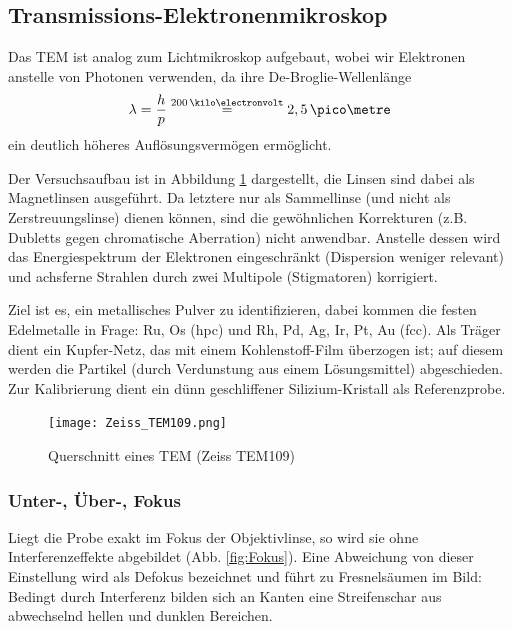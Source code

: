 \newpage
\subsection{Transmissions-Elektronenmikroskop}
Das TEM ist analog zum Lichtmikroskop aufgebaut, wobei wir Elektronen anstelle von Photonen verwenden, da ihre De-Broglie-Wellenlänge
\begin{equation}
\lambda = \frac{h}{p} \stackrel{200\,\kilo\electronvolt}{=} 2,5\,\pico\metre
\end{equation}
ein deutlich höheres Auflösungsvermögen ermöglicht.

Der Versuchsaufbau ist in Abbildung \ref{fig:setup} dargestellt, die Linsen sind dabei als Magnetlinsen ausgeführt. Da letztere nur als Sammellinse (und nicht als Zerstreuungslinse) dienen können, sind die gewöhnlichen Korrekturen (z.B. Dubletts gegen chromatische Aberration) nicht anwendbar. Anstelle dessen wird das Energiespektrum der Elektronen eingeschränkt (Dispersion weniger relevant) und achsferne Strahlen durch zwei Multipole (Stigmatoren) korrigiert.

 Ziel ist es, ein metallisches Pulver zu identifizieren, dabei kommen die festen Edelmetalle in Frage: \textsf{Ru, Os} (hpc) und \textsf{Rh, Pd, Ag, Ir, Pt, Au} (fcc). Als Träger dient ein Kupfer-Netz, das mit einem Kohlenstoff-Film überzogen ist; auf diesem werden die Partikel (durch Verdunstung aus einem Lösungsmittel) abgeschieden. Zur Kalibrierung dient ein dünn geschliffener Silizium-Kristall als Referenzprobe.
\begin{figure}[h]
	\centering
	\texttt{[image: Zeiss\_TEM109.png]}
	\caption{Querschnitt eines TEM (Zeiss TEM109) \cite{lit:tueb}}
	\label{fig:setup}
	\vspace{-4em}
\end{figure}


\subsubsection{Unter-, Über-, Fokus}
Liegt die Probe exakt im Fokus der Objektivlinse, so wird sie ohne Interferenzeffekte abgebildet (Abb. \ref{fig:Fokus}). Eine Abweichung von dieser Einstellung wird  als Defokus bezeichnet und führt zu Fresnelsäumen im Bild: Bedingt durch Interferenz bilden sich an Kanten eine Streifenschar aus abwechselnd hellen und dunklen Bereichen.

